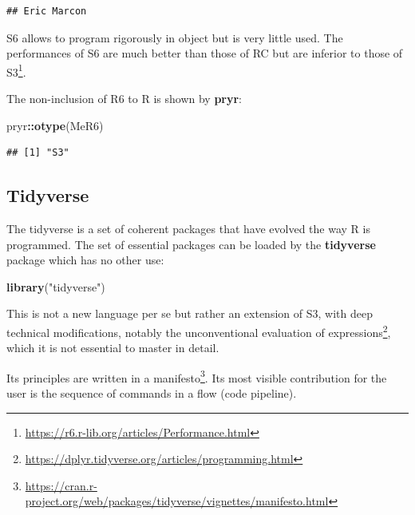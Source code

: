 \documentclass[
  12pt,
  american,
  a4paper,
  extrafontsizes,onecolumn,openright
  ]{memoir}
\newenvironment{Shaded}{\begin{snugshade}}{\end{snugshade}}
\newcommand{\FunctionTok}[1]{\textcolor[rgb]{0.13,0.29,0.53}{\textbf{#1}}}
\newcommand{\NormalTok}[1]{#1}
\newcommand{\SpecialCharTok}[1]{\textcolor[rgb]{0.81,0.36,0.00}{\textbf{#1}}}
\newcommand{\StringTok}[1]{\textcolor[rgb]{0.31,0.60,0.02}{#1}}
\newlength{\rf}
\begin{document}
\begin{verbatim}
## Eric Marcon
\end{verbatim}

\normalsize

S6 allows to program rigorously in object but is very little used.
The performances of S6 are much better than those of RC but are inferior to those of S3\footnote{\url{https://r6.r-lib.org/articles/Performance.html}}.

The non-inclusion of R6 to R is shown by \textbf{pryr}:

\scriptsize

\begin{Shaded}
\begin{Highlighting}[]
\NormalTok{pryr}\SpecialCharTok{::}\FunctionTok{otype}\NormalTok{(MeR6)}
\end{Highlighting}
\end{Shaded}

\begin{verbatim}
## [1] "S3"
\end{verbatim}

\normalsize

\subsection{Tidyverse}\label{tidyverse}

The tidyverse is a set of coherent packages that have evolved the way R is programmed.
The set of essential packages can be loaded by the \textbf{tidyverse} package which has no other use:

\scriptsize

\begin{Shaded}
\begin{Highlighting}[]
\FunctionTok{library}\NormalTok{(}\StringTok{"tidyverse"}\NormalTok{)}
\end{Highlighting}
\end{Shaded}

\normalsize

This is not a new language per se but rather an extension of S3, with deep technical modifications, notably the unconventional evaluation of expressions\footnote{\url{https://dplyr.tidyverse.org/articles/programming.html}}, which it is not essential to master in detail.

Its principles are written in a manifesto\footnote{\url{https://cran.r-project.org/web/packages/tidyverse/vignettes/manifesto.html}}.
Its most visible contribution for the user is the sequence of commands in a flow (code pipeline).
\end{document}
